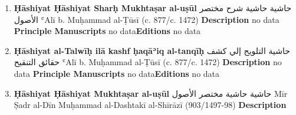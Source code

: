 \documentclass{article}
\begin{document}
\begin{enumerate}
      \item \textbf{Ḥāshiyat Ḥāshiyat Sharḥ Mukhtaṣar al-uṣūl}
        \newline
        \textarabic{حاشية حاشية شرح مختصر الأصول}
        \newline
        ʿAlī b. Muḥammad al-Ṭūsī
        \newline
        (c. 877/c. 1472)
        \newline
        \newline
        \textbf{Description}
        \newline	
        no data
        \newline
        \newline
    \textbf{Principle Manuscripts}
\newline
no data\newline\textbf{Editions}
\newline
no data\newline
      \item \textbf{Ḥāshiyat al-Talwīḥ ilā kashf ḥaqāʾiq al-tanqīḥ}
        \newline
        \textarabic{حاشية التلويح إلي كشف حقائق التنقيح}
        \newline
        ʿAlī b. Muḥammad al-Ṭūsī
        \newline
        (c. 877/c. 1472)
        \newline
        \newline
        \textbf{Description}
        \newline	
        no data
        \newline
        \newline
    \textbf{Principle Manuscripts}
\newline
no data\newline\textbf{Editions}
\newline
no data\newline
      \item \textbf{Ḥāshiyat Ḥāshiyat Mukhtaṣar al-uṣūl}
        \newline
        \textarabic{حاشية حاشية مختصر الأصول}
        \newline
        Mīr Ṣadr al-Dīn Muḥammad al-Dashtakī al-Shīrāzī
        \newline
        (903/1497-98)
        \newline
        \newline
        \textbf{Description}
        \newline	

\end{enumerate}
\end{document}
